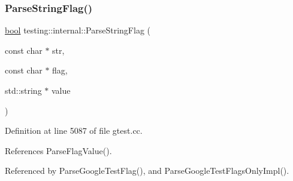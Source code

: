 \subsubsection{\texorpdfstring{Parse\+String\+Flag()}{ParseStringFlag()}}
{\footnotesize\ttfamily \hyperlink{classbool}{bool} testing\+::internal\+::\+Parse\+String\+Flag (\begin{DoxyParamCaption}\item[{const char $\ast$}]{str,  }\item[{const char $\ast$}]{flag,  }\item[{std\+::string $\ast$}]{value }\end{DoxyParamCaption})}



Definition at line 5087 of file gtest.\+cc.



References Parse\+Flag\+Value().



Referenced by Parse\+Google\+Test\+Flag(), and Parse\+Google\+Test\+Flags\+Only\+Impl().


